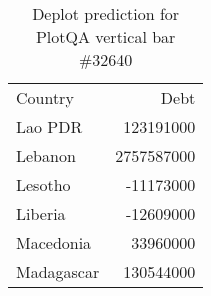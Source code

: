 \begin{table}
    \begin{tabular}{lr}
Country & Debt \\
Lao PDR & 123191000 \\
Lebanon & 2757587000 \\
Lesotho & -11173000 \\
Liberia & -12609000 \\
Macedonia & 33960000 \\
Madagascar & 130544000 \\
\end{tabular}
    \caption{Deplot prediction for PlotQA vertical bar \#32640}
    \label{tab:deplot-plotqa-vbar-32640}
\end{table}
